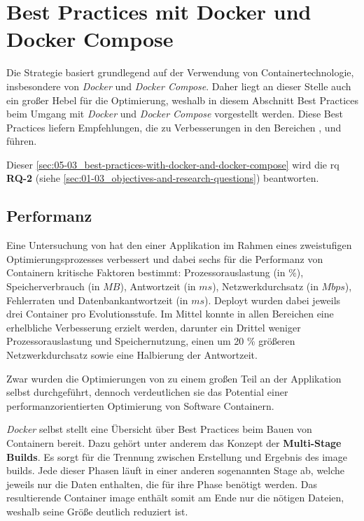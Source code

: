 \section{Best Practices mit Docker und Docker Compose}
\label{sec:05-03_best-practices-with-docker-and-docker-compose}

Die  Strategie basiert grundlegend auf der Verwendung von Containertechnologie, insbesondere von \textit{Docker} und \textit{Docker Compose}. Daher liegt an dieser Stelle auch ein großer Hebel für die Optimierung, weshalb in diesem Abschnitt Best Practices beim Umgang mit \textit{Docker} und \textit{Docker Compose} vorgestellt werden. Diese Best Practices liefern Empfehlungen, die zu Verbesserungen in den Bereichen ,  und  führen.

Dieser \autoref{sec:05-03_best-practices-with-docker-and-docker-compose} wird die \acrlong{rq} \textbf{RQ-2} (siehe \autoref{sec:01-03_objectives-and-research-questions}) beantworten.

\subsection{Performanz}
\label{subsec:05-03-01_performance}

Eine Untersuchung von \citeauthor{002:Optimizing-Cloud-Applications-with-DevOps} hat den  einer Applikation im Rahmen eines zweistufigen Optimierungsprozesses verbessert und dabei sechs für die Performanz von Containern kritische Faktoren bestimmt: Prozessorauslastung (in $\%$), Speicherverbrauch (in $MB$), Antwortzeit (in $ms$), Netzwerkdurchsatz (in $Mbps$), Fehlerraten und Datenbankantwortzeit (in $ms$). Deployt wurden dabei jeweils drei Container pro Evolutionsstufe. Im Mittel konnte in allen Bereichen eine erhelbliche Verbesserung erzielt werden, darunter ein Drittel weniger Prozessorauslastung und Speichernutzung, einen um 20 \% größeren Netzwerkdurchsatz sowie eine Halbierung der Antwortzeit. \cite{002:Optimizing-Cloud-Applications-with-DevOps}

Zwar wurden die Optimierungen von \citeauthor{002:Optimizing-Cloud-Applications-with-DevOps} zu einem großen Teil an der Applikation selbst durchgeführt, dennoch verdeutlichen sie das Potential einer performanzorientierten Optimierung von Software Containern.

\textit{Docker} selbst stellt eine Übersicht über Best Practices beim Bauen von Containern bereit. Dazu gehört unter anderem das Konzept der \textbf{Multi-Stage Builds}. Es sorgt für die Trennung zwischen Erstellung und Ergebnis des \Gls{image} \Glspl{build}. Jede dieser Phasen läuft in einer anderen sogenannten Stage ab, welche jeweils nur die Daten enthalten, die für ihre Phase benötigt werden. Das resultierende Container \Gls{image} enthält somit am Ende nur die nötigen Dateien, weshalb seine Größe deutlich reduziert ist. \cite{300:Building-Best-Practices}

